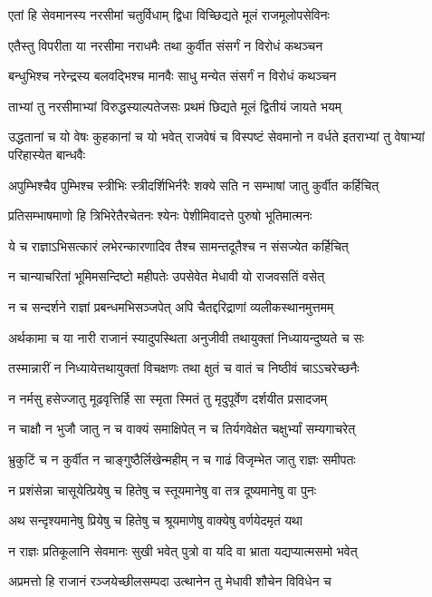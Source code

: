 \twolineshloka
{एतां हि सेवमानस्य नरसीमां चतुर्विधाम्}
{द्विधा विच्छिद्यते मूलं राजमूलोपसेविनः}


\twolineshloka
{एतैस्तु विपरीता या नरसीमा नराधमैः}
{तथा कुर्वीत संसर्गं न विरोधं कथञ्चन}


\twolineshloka
{बन्धुभिश्च नरेन्द्रस्य बलवद्भिश्च मानवैः}
{साधु मन्येत संसर्गं न विरोधं कथञ्चन}


\twolineshloka
{ताभ्यां तु नरसीमाभ्यां विरुद्धस्याल्पतेजसः}
{प्रथमं छिद्यते मूलं द्वितीयं जायते भयम्}


\threelineshloka
{उद्धतानां च यो वेषः कुहकानां च यो भवेत्}
{राजवेषं च विस्पष्टं सेवमानो न वर्धते}
{इतराभ्यां तु वेषाभ्यां परिहास्येत बान्धवैः}


\twolineshloka
{अपुम्भिश्चैव पुम्भिश्च स्त्रीभिः स्त्रीदर्शिभिर्नरैः}
{शक्ये सति न सम्भाषां जातु कुर्वीत कर्हिचित्}


\twolineshloka
{प्रतिसम्भाषमाणो हि त्रिभिरेतैरचेतनः}
{श्येनः पेशीमिवादत्ते पुरुषो भूतिमात्मनः}


\twolineshloka
{ये च राज्ञाऽभिसत्कारं लभेरन्कारणादिव}
{तैश्च सामन्तदूतैश्च न संसज्येत कर्हिचित्}


\twolineshloka
{न चान्याचरितां भूमिमसन्दिष्टो महीपतेः}
{उपसेवेत मेधावी यो राजवसतिं वसेत्}


\twolineshloka
{न च सन्दर्शने राज्ञां प्रबन्धमभिसञ्जपेत्}
{अपि चैतद्दरिद्राणां व्यलीकस्थानमुत्तमम्}


\twolineshloka
{अर्थकामा च या नारी राजानं स्यादुपस्थिता}
{अनुजीवी तथायुक्तां निध्यायन्दुष्यते च सः}


\twolineshloka
{तस्मान्नारीं न निध्यायेत्तथायुक्तां विचक्षणः}
{तथा क्षुतं च वातं च निष्ठीवं चाऽऽचरेच्छनैः}


\twolineshloka
{न नर्मसु हसेज्जातु मूढवृत्तिर्हि सा स्मृता}
{स्मितं तु मृदुपूर्वेण दर्शयीत प्रसादजम्}


\twolineshloka
{न चाक्षौ न भुजौ जातु न च वाक्यं समाक्षिपेत्}
{न च तिर्यगवेक्षेत चक्षुर्भ्यां सम्यगाचरेत्}


\twolineshloka
{भ्रुकुटिं च न कुर्वीत न चाङ्गुष्ठैर्लिखेन्महीम्}
{न च गाढं विजृम्भेत जातु राज्ञः समीपतः}


\twolineshloka
{न प्रशंसेन्ना चासूयेत्प्रियेषु च हितेषु च}
{स्तूयमानेषु वा तत्र दूष्यमानेषु वा पुनः}


\twolineshloka
{अथ सन्दृश्यमानेषु प्रियेषु च हितेषु च}
{श्रूयमाणेषु वाक्येषु वर्णयेदमृतं यथा}


\twolineshloka
{न राज्ञः प्रतिकूलानि सेवमानः सुखी भवेत्}
{पुत्रो वा यदि वा भ्राता यद्यप्यात्मसमो भवेत्}


\twolineshloka
{अप्रमत्तो हि राजानं रञ्जयेच्छीलसम्पदा}
{उत्थानेन तु मेधावी शौचेन विविधेन च}


